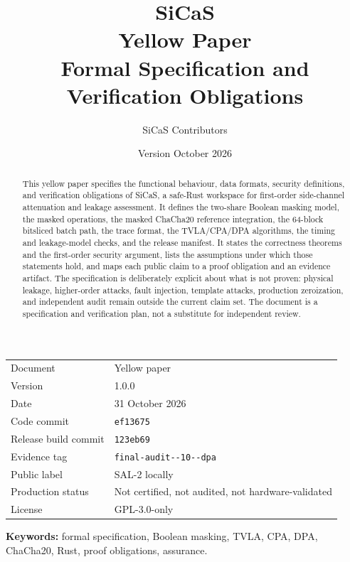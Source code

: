 \documentclass[11pt,a4paper]{article}
\title{%
  \vspace{-1.2cm}
  {\LARGE\bfseries SiCaS}\\[0.35cm]
  {\Large Yellow Paper}\\[0.25cm]
  {\large Formal Specification and Verification Obligations}
}
\author{SiCaS Contributors}
\date{Version \paperversion \quad 31 October 2026}
\newcommand{\paperversion}{1.0.0}
\newcommand{\codecommit}{\texttt{ef13675}}
\newcommand{\evidencetag}{\texttt{final-\allowbreak audit-\allowbreak 2026-10-\allowbreak 31-\allowbreak dpa}}
\theoremstyle{plain}
\theoremstyle{definition}
\theoremstyle{remark}
\begin{document}
\maketitle
\thispagestyle{empty}

\begin{center}
\begin{tabular}{@{}ll@{}}
\toprule
Document & Yellow paper \\
Version & \paperversion \\
Date & 31 October 2026 \\
Code commit & \codecommit \\
Release build commit & \texttt{123eb69} \\
Evidence tag & \evidencetag \\
Public label & SAL-2 locally \\
Production status & Not certified, not audited, not hardware-validated \\
License & GPL-3.0-only \\
\bottomrule
\end{tabular}
\end{center}

\begin{abstract}
This yellow paper specifies the functional behaviour, data formats, security
definitions, and verification obligations of SiCaS, a safe-Rust workspace for
first-order side-channel attenuation and leakage assessment. It defines the two-share
Boolean masking model, the masked operations, the masked ChaCha20 reference
integration, the 64-block bitsliced batch path, the trace format, the TVLA/CPA/DPA
algorithms, the timing and leakage-model checks, and the release manifest. It states
the correctness theorems and the first-order security argument, lists the assumptions
under which those statements hold, and maps each public claim to a proof obligation and
an evidence artifact. The specification is deliberately explicit about what is not
proven: physical leakage, higher-order attacks, fault injection, template attacks,
production zeroization, and independent audit remain outside the current claim set. The
document is a specification and verification plan, not a substitute for independent
review.
\end{abstract}

\vspace{0.3cm}
\noindent\textbf{Keywords:} formal specification, Boolean masking, TVLA, CPA, DPA,
ChaCha20, Rust, proof obligations, assurance.

\newpage
\tableofcontents
\newpage
\end{document}
